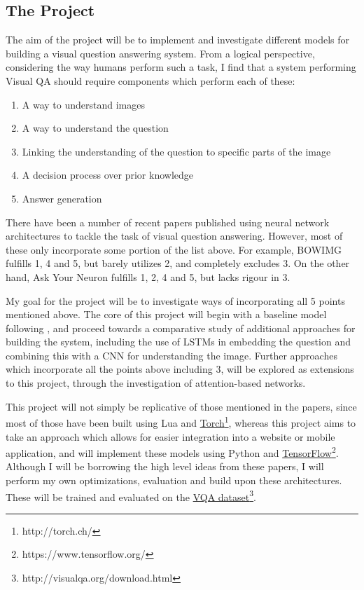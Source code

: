 \documentclass[12pt,a4paper,twoside]{article}
\begin{document}
\subsection{The Project} \label{project}

The aim of the project will be to implement and investigate different models for building a visual question answering system. From a logical perspective, considering the way humans perform such a task, I find that a system performing Visual QA should require components which perform each of these:


\newpage

\begin{enumerate}
	\setlength\itemsep{0.2em}
	\item A way to understand images
	\item A way to understand the question
	\item Linking the understanding of the question to specific parts of the image
	\item A decision process over prior knowledge
	\item Answer generation
\end{enumerate} 
There have been a number of recent papers published using neural network architectures to tackle the task of visual question answering. However, most of these only incorporate some portion of the list above. For example, BOWIMG\cite{Baseline} fulfills 1, 4 and 5, but barely utilizes 2, and completely excludes 3. On the other hand, Ask Your Neuron\cite{CNNLSTM} fulfills 1, 2, 4 and 5, but lacks rigour in 3.

My goal for the project will be to investigate ways of incorporating all 5 points mentioned above. The core of this project will begin with a baseline model following \cite{Baseline}, and proceed towards a comparative study of additional approaches for building the system, including the use of LSTMs in embedding the question and combining this with a CNN for understanding the image. Further approaches which incorporate all the points above including 3, will be explored as extensions to this project, through the investigation of attention-based networks\cite{coAtt}.

This project will not simply be replicative of those mentioned in the papers, since most of those have been built using Lua and \href{http://torch.ch/}{Torch}\footnote{http://torch.ch/}, whereas this project aims to take an approach which allows for easier integration into a website or mobile application, and will implement these models using Python and \href{https://www.tensorflow.org/}{TensorFlow}\footnote{https://www.tensorflow.org/}. Although I will be borrowing the high level ideas from these papers, I will perform my own optimizations, evaluation and build upon these architectures. These will be trained and evaluated on the \href{http://visualqa.org/download.html}{VQA dataset}\footnote{http://visualqa.org/download.html}. 
\end{document}
